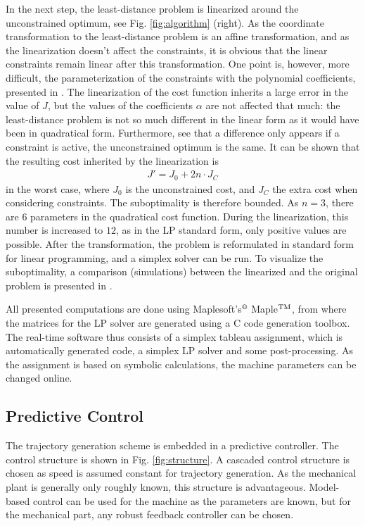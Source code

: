 \documentclass[a4paper,11pt,fleqn]{article}
\begin{document}
In the next step, the least-distance problem is linearized around the unconstrained optimum, see Fig. \ref{fig:algorithm} (right). As the coordinate transformation to the least-distance problem is an affine transformation, and as the linearization doesn't affect the constraints, it is obvious that the linear constraints remain linear after this transformation. One point is, however, more difficult, the parameterization of the constraints with the polynomial coefficients, presented in \cite{SK10}. The linearization of the cost function inherits a large error in the value of $J$, but the values of the coefficients $\alpha$ are not affected that much: the least-distance problem is not so much different in the linear form as it would have been in quadratical form. Furthermore, see that a difference only appears if a constraint is active, the unconstrained optimum is the same. It can be shown that the resulting cost inherited by the linearization is
\begin{align}
J' = J_0 + 2 n  \cdot J_C
\end{align}
in the worst case, where $J_0$ is the unconstrained cost, and $J_C$ the extra cost when considering constraints. The suboptimality is therefore bounded. As $n=3$, there are $6$ parameters in the quadratical cost function. During the linearization, this number is increased to $12$, as in the LP standard form, only positive values are possible. After the transformation, the problem is reformulated in standard form for linear programming, and a simplex solver \cite{LPalg} can be run. To visualize the suboptimality, a comparison (simulations) between the linearized and the original problem is presented in \cite{SK10}. 


All presented computations are done using Maplesoft's$^\text{\textregistered}$ Maple$^{\textnormal{TM}}$, from where the matrices for the LP solver are generated using a C code generation toolbox. The real-time software thus consists of a simplex tableau assignment, which is automatically generated code, a simplex LP solver and some post-processing. As the assignment is based on symbolic calculations, the machine parameters can be changed online.



\subsection*{Predictive Control}

The trajectory generation scheme is embedded in a predictive controller. The control structure is shown in Fig. \ref{fig:structure}. A cascaded control structure is chosen as speed is assumed constant for trajectory generation. As the mechanical plant is generally only roughly known, this structure is advantageous. Model-based control can be used for the machine as the parameters are known, but for the mechanical part, any robust feedback controller can be chosen.
\end{document}
